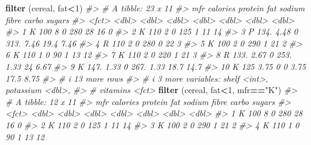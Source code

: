 \documentclass[
]{book}
\newenvironment{Shaded}{\begin{snugshade}}{\end{snugshade}}
\newcommand{\CommentTok}[1]{\textcolor[rgb]{0.56,0.35,0.01}{\textit{#1}}}
\newcommand{\DecValTok}[1]{\textcolor[rgb]{0.00,0.00,0.81}{#1}}
\newcommand{\FunctionTok}[1]{\textcolor[rgb]{0.13,0.29,0.53}{\textbf{#1}}}
\newcommand{\NormalTok}[1]{#1}
\newcommand{\SpecialCharTok}[1]{\textcolor[rgb]{0.81,0.36,0.00}{\textbf{#1}}}
\newcommand{\StringTok}[1]{\textcolor[rgb]{0.31,0.60,0.02}{#1}}
\begin{document}
\begin{Shaded}
\begin{Highlighting}[]
\FunctionTok{filter}\NormalTok{ (cereal, fat}\SpecialCharTok{\textless{}}\DecValTok{1}\NormalTok{)}
\CommentTok{\#\textgreater{} \# A tibble: 23 x 11}
\CommentTok{\#\textgreater{}    mfr   calories protein   fat sodium fibre carbo sugars}
\CommentTok{\#\textgreater{}    \textless{}fct\textgreater{}    \textless{}dbl\textgreater{}   \textless{}dbl\textgreater{} \textless{}dbl\textgreater{}  \textless{}dbl\textgreater{} \textless{}dbl\textgreater{} \textless{}dbl\textgreater{}  \textless{}dbl\textgreater{}}
\CommentTok{\#\textgreater{}  1 K         100     8        0   280  28     16     0   }
\CommentTok{\#\textgreater{}  2 K         110     2        0   125   1     11    14   }
\CommentTok{\#\textgreater{}  3 P         134.    4.48     0   313.  7.46  19.4   7.46}
\CommentTok{\#\textgreater{}  4 R         110     2        0   280   0     22     3   }
\CommentTok{\#\textgreater{}  5 K         100     2        0   290   1     21     2   }
\CommentTok{\#\textgreater{}  6 K         110     1        0    90   1     13    12   }
\CommentTok{\#\textgreater{}  7 K         110     2        0   220   1     21     3   }
\CommentTok{\#\textgreater{}  8 R         133.    2.67     0   253.  1.33  24     6.67}
\CommentTok{\#\textgreater{}  9 K         147.    1.33     0   267.  1.33  18.7  14.7 }
\CommentTok{\#\textgreater{} 10 K         125     3.75     0     0   3.75  17.5   8.75}
\CommentTok{\#\textgreater{} \# i 13 more rows}
\CommentTok{\#\textgreater{} \# i 3 more variables: shelf \textless{}int\textgreater{}, potassium \textless{}dbl\textgreater{},}
\CommentTok{\#\textgreater{} \#   vitamins \textless{}fct\textgreater{}}
\FunctionTok{filter}\NormalTok{ (cereal, fat}\SpecialCharTok{\textless{}}\DecValTok{1}\NormalTok{, mfr}\SpecialCharTok{==}\StringTok{"K"}\NormalTok{)}
\CommentTok{\#\textgreater{} \# A tibble: 12 x 11}
\CommentTok{\#\textgreater{}    mfr   calories protein   fat sodium fibre carbo sugars}
\CommentTok{\#\textgreater{}    \textless{}fct\textgreater{}    \textless{}dbl\textgreater{}   \textless{}dbl\textgreater{} \textless{}dbl\textgreater{}  \textless{}dbl\textgreater{} \textless{}dbl\textgreater{} \textless{}dbl\textgreater{}  \textless{}dbl\textgreater{}}
\CommentTok{\#\textgreater{}  1 K         100     8        0   280  28     16     0   }
\CommentTok{\#\textgreater{}  2 K         110     2        0   125   1     11    14   }
\CommentTok{\#\textgreater{}  3 K         100     2        0   290   1     21     2   }
\CommentTok{\#\textgreater{}  4 K         110     1        0    90   1     13    12   }

\end{Highlighting}
\end{Shaded}
\end{document}
